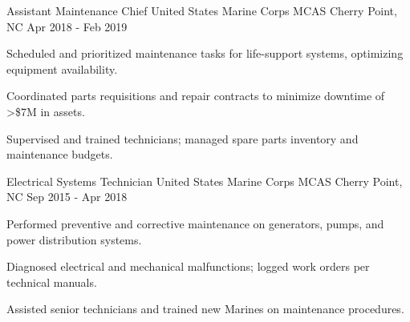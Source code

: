 \begin{cventries}
  \cventry
    {Assistant Maintenance Chief} %
    {United States Marine Corps} %
    {MCAS Cherry Point, NC} %
    {Apr 2018 - Feb 2019} %
    {
      \begin{cvitems} %
        \item {Scheduled and prioritized maintenance tasks for life-support systems, optimizing equipment availability.}
        \item {Coordinated parts requisitions and repair contracts to minimize downtime of >\$7M in assets.}
        \item {Supervised and trained technicians; managed spare parts inventory and maintenance budgets.}
      \end{cvitems}
    }

  \cventry
    {Electrical Systems Technician} %
    {United States Marine Corps} %
    {MCAS Cherry Point, NC} %
    {Sep 2015 - Apr 2018} %
    {
      \begin{cvitems} %
        \item {Performed preventive and corrective maintenance on generators, pumps, and power distribution systems.}
        \item {Diagnosed electrical and mechanical malfunctions; logged work orders per technical manuals.}
        \item {Assisted senior technicians and trained new Marines on maintenance procedures.}
      \end{cvitems}
    }

\end{cventries}
